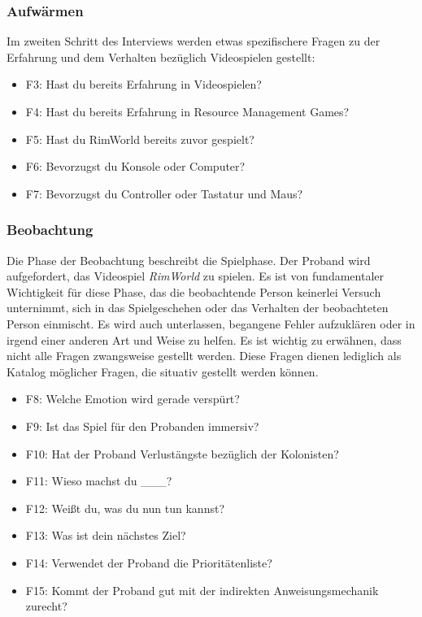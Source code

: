 \subsubsection{Aufwärmen}
Im zweiten Schritt des Interviews werden etwas spezifischere Fragen zu der Erfahrung und dem Verhalten bezüglich Videospielen gestellt:
\begin{itemize}
    \item F3: Hast du bereits Erfahrung in Videospielen?
    \item F4: Hast du bereits Erfahrung in Resource Management Games?
    \item F5: Hast du RimWorld bereits zuvor gespielt?
    \item F6: Bevorzugst du Konsole oder Computer?
    \item F7: Bevorzugst du Controller oder Tastatur und Maus?
\end{itemize}

\subsubsection{Beobachtung}
Die Phase der Beobachtung beschreibt die Spielphase. Der Proband wird aufgefordert, das Videospiel \textit{RimWorld} zu spielen. Es ist von fundamentaler Wichtigkeit für diese Phase, das die beobachtende Person keinerlei Versuch unternimmt, sich in das Spielgeschehen oder das Verhalten der beobachteten Person einmischt. Es wird auch unterlassen, begangene Fehler aufzuklären oder in irgend einer anderen Art und Weise zu helfen. Es ist wichtig zu erwähnen, dass nicht alle Fragen zwangsweise gestellt werden. Diese Fragen dienen lediglich als Katalog möglicher Fragen, die situativ gestellt werden können.

\begin{itemize}
    \item F8: Welche Emotion wird gerade verspürt?
    \item F9: Ist das Spiel für den Probanden immersiv?
    \item F10: Hat der Proband Verlustängste bezüglich der Kolonisten?
    \item F11: Wieso machst du \_\_\_?
    \item F12: Weißt du, was du nun tun kannst?
    \item F13: Was ist dein nächstes Ziel?
    \item F14: Verwendet der Proband die Prioritätenliste?
    \item F15: Kommt der Proband gut mit der indirekten Anweisungsmechanik zurecht?
\end{itemize}

